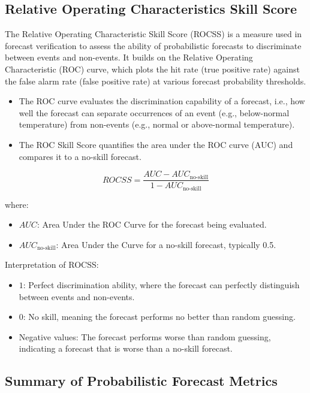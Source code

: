 \subsection{Relative Operating Characteristics Skill Score}

The Relative Operating Characteristic Skill Score (ROCSS) is a measure used in forecast verification to assess the ability of probabilistic forecasts to discriminate between events and non-events. It builds on the Relative Operating Characteristic (ROC) curve, which plots the hit rate (true positive rate) against the false alarm rate (false positive rate) at various forecast probability thresholds.

\begin{itemize}
	\item The ROC curve evaluates the discrimination capability of a forecast, i.e., how well the forecast can separate occurrences of an event (e.g., below-normal temperature) from non-events (e.g., normal or above-normal temperature).
	\item The ROC Skill Score quantifies the area under the ROC curve (AUC) and compares it to a no-skill forecast.
\end{itemize}

\[
ROCSS = \frac{AUC - AUC_{\text{no-skill}}}{1 - AUC_{\text{no-skill}}}
\]

where:  
\begin{itemize}
	\item \( AUC \): Area Under the ROC Curve for the forecast being evaluated.  
	\item \( AUC_{\text{no-skill}} \): Area Under the Curve for a no-skill forecast, typically 0.5.  
\end{itemize}

Interpretation of ROCSS:  
\begin{itemize}
	\item \( 1 \): Perfect discrimination ability, where the forecast can perfectly distinguish between events and non-events.  
	\item \( 0 \): No skill, meaning the forecast performs no better than random guessing.  
	\item Negative values: The forecast performs worse than random guessing, indicating a forecast that is worse than a no-skill forecast.  
\end{itemize}
\subsection{Summary of Probabilistic Forecast Metrics}

